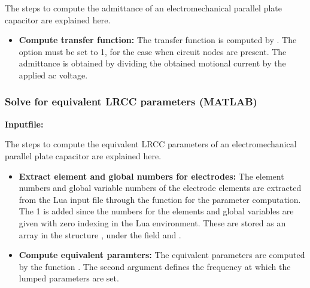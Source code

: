 \clearpage
The steps to compute the admittance of an electromechanical
parallel plate capacitor are 
explained here. 

\begin{itemize}

  \item{\textbf{Compute transfer function:}}
  The transfer function is computed by . The
  option  must be set to 1, for the case when circuit nodes
  are present. The admittance is obtained by dividing the obtained
  motional current by the applied ac voltage.

\end{itemize}

\clearpage
\subsubsection*{Solve for equivalent LRCC parameters (MATLAB)}
\begin{flushleft}
  \textbf{Inputfile:}
  \\
\end{flushleft}
\hspace{1in}
{\footnotesize
{}
}

\clearpage
The steps to compute the equivalent LRCC parameters of an 
electromechanical parallel plate capacitor are 
explained here. 

\begin{itemize}

  \item{\textbf{Extract element and global numbers for electrodes:}}
  The element numbers and global variable numbers of the electrode
  elements are extracted from the Lua input file through the function
   for the parameter computation. The 1 is added
  since the numbers for the elements and global variables are given
  with zero indexing in the Lua environment. These are stored as an
  array in the structure , under the field  and
  . 

  \item{\textbf{Compute equivalent paramters:}}
  The equivalent parameters are computed by the function
  . The second argument  defines the
  frequency at which the lumped parameters are set. 

\end{itemize}

